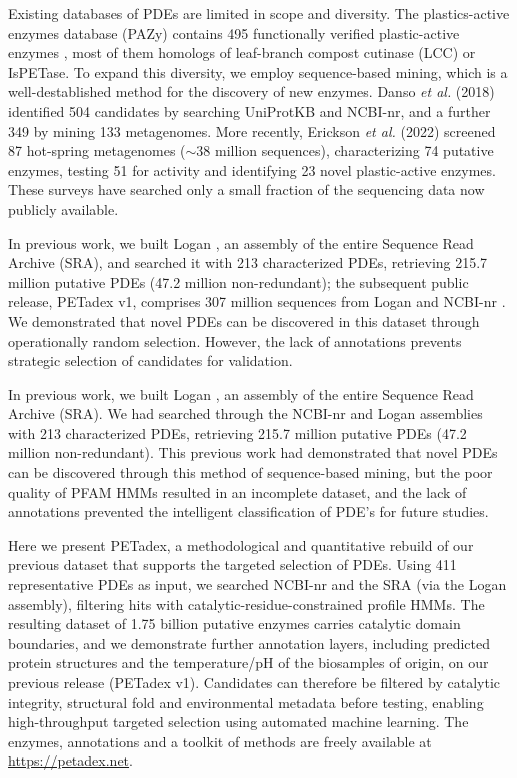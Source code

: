 \documentclass[pdflatex,sn-nature,iicol]{sn-jnl}%
\begin{document}
Existing databases of PDEs are limited in scope and diversity. The plastics-active enzymes database (PAZy) contains 495 functionally verified plastic-active enzymes \citep{buchholz2022pazy}, most of them homologs of leaf-branch compost cutinase (LCC) \citep{sulaiman2012lcc} or IsPETase. To expand this diversity, we employ sequence-based mining, which is a well-destablished method for the discovery of new enzymes. Danso \textit{et al.} (2018) \citep{danso2018} identified 504 candidates by searching UniProtKB and NCBI-nr, and a further 349 by mining 133 metagenomes. More recently, Erickson \textit{et al.} (2022) \citep{erickson2022} screened 87 hot-spring metagenomes ($\sim$38 million sequences), characterizing 74 putative enzymes, testing 51 for activity and identifying 23 novel plastic-active enzymes. These surveys have searched only a small fraction of the sequencing data now publicly available. 

In previous work, we built Logan \citep{chikhi2024logan}, an assembly of the entire Sequence Read Archive (SRA), and searched it with 213 characterized PDEs, retrieving 215.7 million putative PDEs (47.2 million non-redundant); the subsequent public release, PETadex v1, comprises 307 million sequences from Logan and NCBI-nr \citep{petadexweb}. We demonstrated that novel PDEs can be discovered in this dataset through operationally random selection. However, the lack of annotations prevents strategic selection of candidates for validation.

In previous work, we built Logan \citep{chikhi2024logan}, an assembly of the entire Sequence Read Archive (SRA). We had searched through the NCBI-nr and Logan assemblies with 213 characterized PDEs, retrieving 215.7 million putative PDEs (47.2 million non-redundant). This previous work had demonstrated that novel PDEs can be discovered through this method of sequence-based mining, but the poor quality of PFAM HMMs resulted in an incomplete dataset, and the lack of annotations prevented the intelligent classification of PDE's for future studies.  

Here we present PETadex, a methodological and quantitative rebuild of our previous dataset that supports the targeted selection of PDEs. Using 411 representative PDEs as input, we searched NCBI-nr and the SRA (via the Logan assembly), filtering hits with catalytic-residue-constrained profile HMMs. The resulting dataset of 1.75 billion putative enzymes carries catalytic domain boundaries, and we demonstrate further annotation layers, including predicted protein structures and the temperature/pH of the biosamples of origin, on our previous release (PETadex v1). Candidates can therefore be filtered by catalytic integrity, structural fold and environmental metadata before testing, enabling high-throughput targeted selection using automated machine learning. The enzymes, annotations and a toolkit of methods are freely available at \url{https://petadex.net}.
\end{document}

